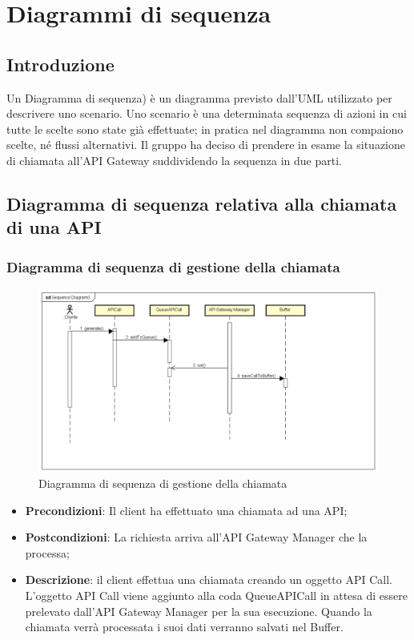 \newpage
\section{Diagrammi di sequenza}
\subsection{Introduzione}
Un Diagramma di sequenza) è un diagramma previsto dall'UML utilizzato per descrivere uno scenario.
Uno scenario è una determinata sequenza di azioni in cui tutte le scelte sono state già effettuate; in pratica nel diagramma non compaiono scelte, né flussi alternativi.
Il gruppo ha deciso di prendere in esame la situazione di chiamata all'API Gateway suddividendo la sequenza in due parti.

\subsection{Diagramma di sequenza relativa alla chiamata di una API}
\subsubsection{Diagramma di sequenza di gestione della chiamata}
\begin{figure}[h]
	\centering
	\includegraphics[width=1.0\linewidth]{"IMG/Sequence Diagram0"}
	\caption{Diagramma di sequenza di gestione della chiamata}
\end{figure}

\begin{itemize}
	\item \textbf{Precondizioni}: Il client ha effettuato una chiamata ad una API;
	\item \textbf{Postcondizioni}: La richiesta arriva all'API Gateway Manager che la processa;
	\item \textbf{Descrizione}: il client effettua una chiamata creando un oggetto API Call. L'oggetto API Call viene aggiunto alla coda QueueAPICall in attesa di essere prelevato dall'API Gateway Manager per la sua esecuzione. Quando la chiamata verrà processata i suoi dati verranno salvati nel Buffer.
\end{itemize}

